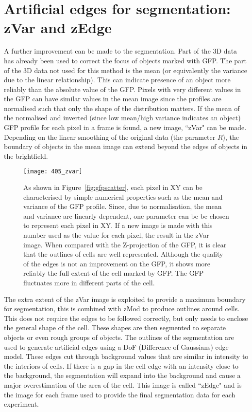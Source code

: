\section{Artificial edges for segmentation: zVar and zEdge}

A further improvement can be made to the segmentation. Part of the 3D data has already been used to correct the focus of objects marked with GFP. The part of the 3D data not used for this method is the mean (or equivalently the variance due to the linear relationship). This can indicate presence of an object more reliably than the absolute value of the GFP. Pixels with very different values in the GFP can have similar values in the mean image since the profiles are normalised such that only the shape of the distribution matters. If the mean of the normalised and inverted (since low mean/high variance indicates an object) GFP profile for each pixel in a frame is found, a new image, ``zVar" can be made. Depending on the linear smoothing of the original data (the parameter $R$), the boundary of objects in the mean image can extend beyond the edges of objects in the brightfield.

\begin{figure}[h!]
 \centering
 \texttt{[image: 405\_zvar]}
 \caption[zVar example]{
 	As shown in Figure~\ref{fig:gfpscatter}, each pixel in XY can be characterised by simple numerical properties such as the mean and variance of the GFP profile. Since, due to normalisation, the mean and variance are linearly dependent, one parameter can be be chosen to represent each pixel in XY. If a new image is made with this number used as the value for each pixel, the result in the zVar image. When compared with the Z-projection of the GFP, it is clear that the outlines of cells are well represented. Although the quality of the edges is not an improvement on the GFP, it shows more reliably the full extent of the cell marked by GFP. The GFP fluctuates more in different parts of the cell.
 }
 \label{fig:zvar}
\end{figure}

The extra extent of the zVar image is exploited to provide a maximum boundary for segmentation, this is combined with zMod to produce outlines around cells. This does not require the edges to be followed correctly, but only needs to enclose the general shape of the cell. These shapes are then segmented to separate objects or even rough groups of objects. The outlines of the segmentation are used to generate artificial edges using a DoF (Difference of Gaussians) edge model. These edges cut through background values that are similar in intensity to the interiors of cells. If there is a gap in the cell edge with an intensity close to the background, the segmentation will expand into the background and cause a major overestimation of the area of the cell. This image is called ``zEdge" and is the image for each frame used to provide the final segmentation data for each experiment.

